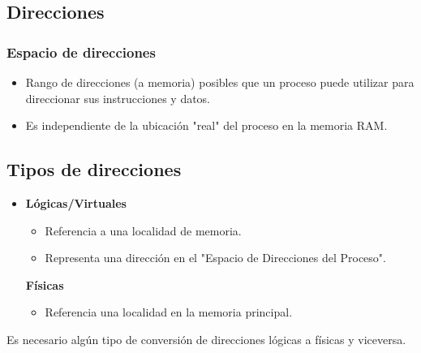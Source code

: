 \subsection{Direcciones}
\subsubsection{Espacio de direcciones}
\begin{itemize}
    \item Rango de direcciones (a memoria) posibles que un proceso puede utilizar para direccionar sus instrucciones y datos.
    \item Es independiente de la ubicación "real" del proceso en la memoria RAM.
\end{itemize}

\subsection{Tipos de direcciones}
\begin{itemize}
    \item \textbf{Lógicas/Virtuales}
    \begin{itemize}
        \item Referencia a una localidad de memoria.
        \item Representa una dirección en el "Espacio de Direcciones del Proceso".
    \end{itemize}
    \textbf{Físicas}
    \begin{itemize}
        \item Referencia una localidad en la memoria principal.
    \end{itemize}
\end{itemize}
Es necesario algún tipo de conversión de direcciones lógicas a físicas y viceversa.
